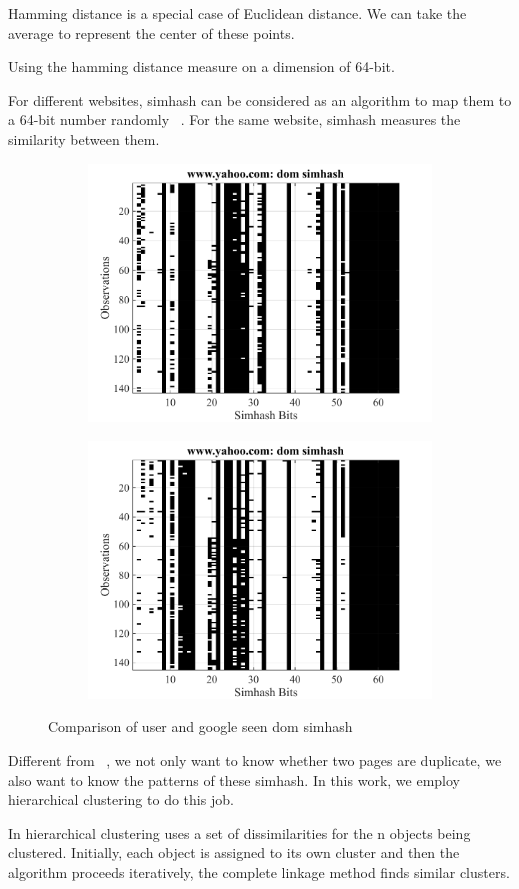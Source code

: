 Hamming distance is a special case of Euclidean distance. We can take the
average to represent the center of these points.


Using the hamming distance measure on a dimension of 64-bit.


For different websites, simhash can be considered as an algorithm to map them to
a 64-bit number randomly ~\cite{manku2007detecting}. For the same website,
simhash measures the similarity between them.



\begin{figure}[t]
  \centering
  \begin{subfigure}
    \centering
    \includegraphics[width=.5\textwidth]{fig/yahoo-dom-user}
    \label{fig:yahoo-dom-user}
  \end{subfigure}%
  \begin{subfigure}
    \centering
    \includegraphics[width=.5\textwidth]{fig/yahoo-dom-google}
    \label{fig:yahoo-dom-google}
  \end{subfigure}
  \caption{Comparison of user and google seen dom simhash}
  \label{fig:yahoo-simhash}
\end{figure}




Different from ~\cite{manku2007detecting}, we not only want to know whether two pages are
duplicate, we also want to know the patterns of these simhash. In this work, we employ
hierarchical clustering to do this job.

In hierarchical clustering uses a set of dissimilarities for the n objects being clustered.
Initially, each object is assigned to its own cluster and then the algorithm
proceeds iteratively, the complete linkage method finds similar clusters.

